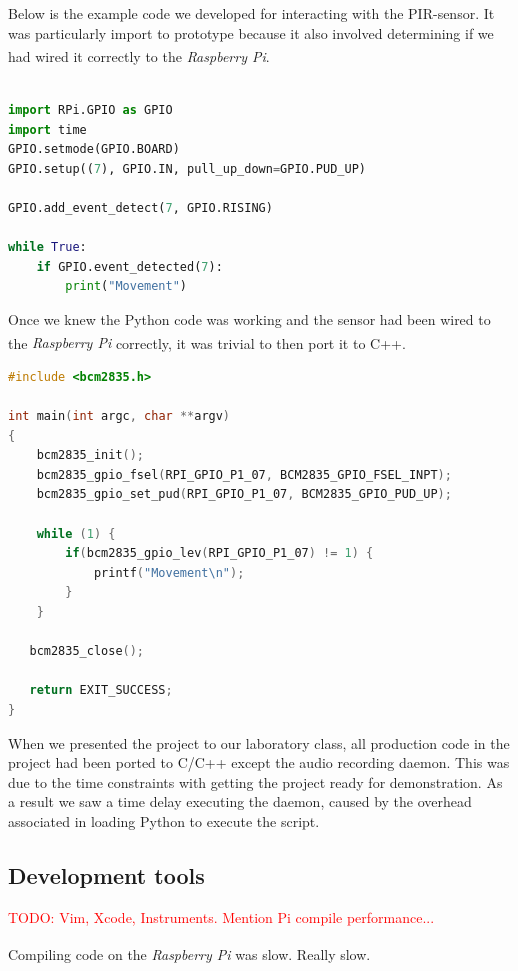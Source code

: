 \documentclass[11pt,a4paper,titlepage]{report}
\newcommand{\rpi}{\textit{Raspberry Pi\textsuperscript{\textregistered}}}
\begin{document}
Below is the example code we developed for interacting with the PIR-sensor. It was particularly import to prototype because it also involved determining if we had wired it correctly to the \rpi.

\begin{lstlisting}[caption={Python code for interacting with the PIR-sensor},label=pir-sensor-test.py,language=python]

import RPi.GPIO as GPIO
import time
GPIO.setmode(GPIO.BOARD)
GPIO.setup((7), GPIO.IN, pull_up_down=GPIO.PUD_UP)

GPIO.add_event_detect(7, GPIO.RISING)

while True:
    if GPIO.event_detected(7):
        print("Movement")
\end{lstlisting}

Once we knew the Python code was working and the sensor had been wired to the \rpi\xspace correctly, it was trivial to then port it to C++.

\begin{lstlisting}[caption={C++ port of PIR-sensor code},label=pir-sensor-test.cpp,language=C++]
#include <bcm2835.h>

int main(int argc, char **argv)
{
    bcm2835_init();
    bcm2835_gpio_fsel(RPI_GPIO_P1_07, BCM2835_GPIO_FSEL_INPT);
    bcm2835_gpio_set_pud(RPI_GPIO_P1_07, BCM2835_GPIO_PUD_UP);

    while (1) {
        if(bcm2835_gpio_lev(RPI_GPIO_P1_07) != 1) {
            printf("Movement\n");
        }
    }

   bcm2835_close();

   return EXIT_SUCCESS;
}
\end{lstlisting}

When we presented the project to our laboratory class, all production code in the project had been ported to C/C++ except the audio recording daemon. This was due to the time constraints with getting the project ready for demonstration. As a result we saw a time delay executing the daemon, caused by the overhead associated in loading Python to execute the script.


\subsection{Development tools}

\textcolor{red}{TODO: Vim, Xcode, Instruments. Mention Pi compile performance...}


Compiling code on the \rpi\xspace was slow. Really slow.
\end{document}
